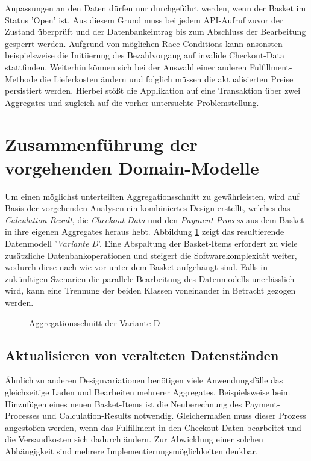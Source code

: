 Anpassungen an den Daten dürfen nur durchgeführt werden, wenn der Basket im Status 'Open' ist. Aus diesem Grund muss bei jedem API-Aufruf zuvor der Zustand überprüft und der Datenbankeintrag bis zum Abschluss der Bearbeitung gesperrt werden. Aufgrund von möglichen Race Conditions kann ansonsten beispielsweise die Initiierung des Bezahlvorgang auf invalide Checkout-Data stattfinden. Weiterhin können sich bei der Auswahl einer anderen Fulfillment-Methode die Lieferkosten ändern und folglich müssen die aktualisierten Preise persistiert werden. Hierbei stößt die Applikation auf eine Transaktion über zwei Aggregates und zugleich auf die vorher untersuchte Problemstellung.


\section{Zusammenführung der vorgehenden Domain-Modelle}

Um einen möglichst unterteilten Aggregationsschnitt zu gewährleisten, wird auf Basis der vorgehenden Analysen ein kombiniertes Design erstellt, welches das \emph{Calculation-Result}, die \emph{Checkout-Data} und den \emph{Payment-Process} aus dem Basket in ihre eigenen Aggregates heraus hebt. Abbildung \ref{fig:VarD} zeigt das resultierende Datenmodell '\emph{Variante D}'. Eine Abspaltung der Basket-Items erfordert zu viele zusätzliche Datenbankoperationen und steigert die Softwarekomplexität weiter, wodurch diese nach wie vor unter dem Basket aufgehängt sind. Falls in zukünftigen Szenarien die parallele Bearbeitung des Datenmodells unerlässlich wird, kann eine Trennung der beiden Klassen voneinander in Betracht gezogen werden.  

\begin{figure}[htbp]
	\centering
	
	\caption{Aggregationsschnitt der Variante D}
	\label{fig:VarD}
\end{figure}

\subsection{Aktualisieren von veralteten Datenständen}

Ähnlich zu anderen Designvariationen benötigen viele Anwendungsfälle das gleichzeitige Laden und Bearbeiten mehrerer Aggregates. Beispielsweise beim Hinzufügen eines neuen Basket-Items ist die Neuberechnung des Payment-Processes und Calculation-Results notwendig. Gleichermaßen muss dieser Prozess angestoßen werden, wenn das Fulfillment in den Checkout-Daten bearbeitet und die Versandkosten sich dadurch ändern. Zur Abwicklung einer solchen Abhängigkeit sind mehrere Implementierungsmöglichkeiten denkbar.

